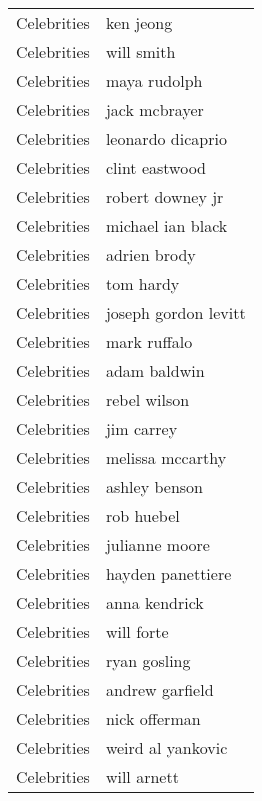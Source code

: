 \begin{supertabular}{l p{0.25\textwidth}}
      Celebrities &                          ken jeong \\
      Celebrities &                         will smith \\
      Celebrities &                       maya rudolph \\
      Celebrities &                      jack mcbrayer \\
      Celebrities &                  leonardo dicaprio \\
      Celebrities &                     clint eastwood \\
      Celebrities &                   robert downey jr \\
      Celebrities &                  michael ian black \\
      Celebrities &                       adrien brody \\
      Celebrities &                          tom hardy \\
      Celebrities &               joseph gordon levitt \\
      Celebrities &                       mark ruffalo \\
      Celebrities &                       adam baldwin \\
      Celebrities &                       rebel wilson \\
      Celebrities &                         jim carrey \\
      Celebrities &                   melissa mccarthy \\
      Celebrities &                      ashley benson \\
      Celebrities &                         rob huebel \\
      Celebrities &                     julianne moore \\
      Celebrities &                  hayden panettiere \\
      Celebrities &                      anna kendrick \\
      Celebrities &                         will forte \\
      Celebrities &                       ryan gosling \\
      Celebrities &                    andrew garfield \\
      Celebrities &                      nick offerman \\
      Celebrities &                  weird al yankovic \\
      Celebrities &                        will arnett \\

\end{supertabular}

